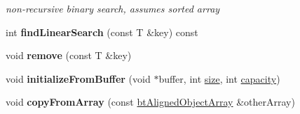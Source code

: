 \begin{DoxyCompactItemize}
\begin{DoxyCompactList}\small\item\em non-\/recursive binary search, assumes sorted array \end{DoxyCompactList}\item 
\mbox{\label{classbtAlignedObjectArray_a2643f69d951072a370493392f9d13e5b}} 
int {\bfseries find\+Linear\+Search} (const T \&key) const
\item 
\mbox{\label{classbtAlignedObjectArray_a6782242f06df5bab0cffbd23195cd9cd}} 
void {\bfseries remove} (const T \&key)
\item 
\mbox{\label{classbtAlignedObjectArray_aa8d21bd5fe47cfe0216990b78fef665e}} 
void {\bfseries initialize\+From\+Buffer} (void $\ast$buffer, int \hyperlink{classbtAlignedObjectArray_a31de8d83d29c6edd1493fc583091194c}{size}, int \hyperlink{classbtAlignedObjectArray_a1baf76f9f52df3c2d742194ba33e8788}{capacity})
\item 
\mbox{\label{classbtAlignedObjectArray_a1464bd66b0e5e3880b4c7aa4a2ce13a1}} 
void {\bfseries copy\+From\+Array} (const \hyperlink{classbtAlignedObjectArray}{bt\+Aligned\+Object\+Array} \&other\+Array)
\end{DoxyCompactItemize}
